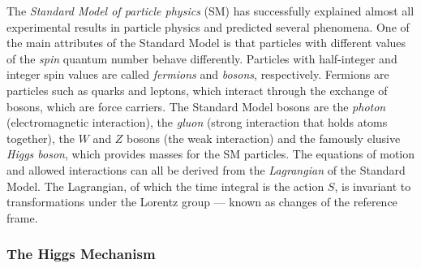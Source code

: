 \documentclass[twoside,english]{uiofysmaster}
\begin{document}
The \textit{Standard Model of particle physics} (SM) has successfully explained almost all experimental results in particle physics and predicted several phenomena. One of the main attributes of the Standard Model is that particles with different values of the \textit{spin} quantum number behave differently. Particles with half-integer and integer spin values are called \textit{fermions} and \textit{bosons}, respectively. Fermions are particles such as quarks and leptons, which interact through the exchange of bosons, which are force carriers. The Standard Model bosons are the \textit{photon} (electromagnetic interaction), the \textit{gluon} (strong interaction that holds atoms together), the $W$ and $Z$ bosons (the weak interaction) and the famously elusive \textit{Higgs boson}, which provides masses for the SM particles. The equations of motion and allowed interactions can all be derived from the \textit{Lagrangian} of the Standard Model. The Lagrangian, of which the time integral is the action $S$, is invariant to transformations under the Lorentz group --- known as changes of the reference frame. 

\subsubsection{The Higgs Mechanism}\label{Sec:: phys back : The Higgs Mechanism}
\end{document}
